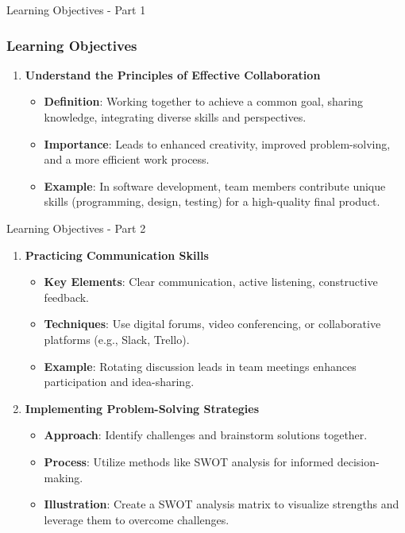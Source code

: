 \documentclass[aspectratio=169]{beamer}
\begin{document}
\begin{frame}[fragile]{Learning Objectives - Part 1}
    \frametitle{Learning Objectives}
    \begin{enumerate}
        \item \textbf{Understand the Principles of Effective Collaboration}
        \begin{itemize}
            \item \textbf{Definition}: Working together to achieve a common goal, sharing knowledge, integrating diverse skills and perspectives.
            \item \textbf{Importance}: Leads to enhanced creativity, improved problem-solving, and a more efficient work process.
            \item \textbf{Example}: In software development, team members contribute unique skills (programming, design, testing) for a high-quality final product.
        \end{itemize}
    \end{enumerate}
\end{frame}

\begin{frame}[fragile]{Learning Objectives - Part 2}
    \begin{enumerate}[resume]
        \item \textbf{Practicing Communication Skills}
        \begin{itemize}
            \item \textbf{Key Elements}: Clear communication, active listening, constructive feedback.
            \item \textbf{Techniques}: Use digital forums, video conferencing, or collaborative platforms (e.g., Slack, Trello).
            \item \textbf{Example}: Rotating discussion leads in team meetings enhances participation and idea-sharing.
        \end{itemize}

        \item \textbf{Implementing Problem-Solving Strategies}
        \begin{itemize}
            \item \textbf{Approach}: Identify challenges and brainstorm solutions together.
            \item \textbf{Process}: Utilize methods like SWOT analysis for informed decision-making.
            \item \textbf{Illustration}: Create a SWOT analysis matrix to visualize strengths and leverage them to overcome challenges.
        \end{itemize}
    \end{enumerate}
\end{frame}
\end{document}
